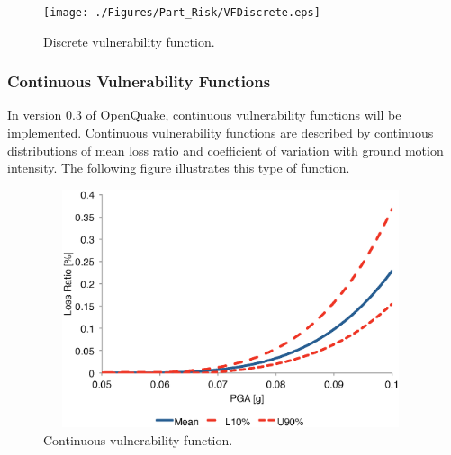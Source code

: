 \begin{figure}[ht]
\centering
\texttt{[image: ./Figures/Part\_Risk/VFDiscrete.eps]}
\caption{Discrete vulnerability function.}
\label{fig:VFDiscrete}
\end{figure}

\subsubsection{Continuous Vulnerability Functions}
In version 0.3 of OpenQuake, continuous vulnerability functions will be implemented. Continuous vulnerability functions are described by continuous distributions of mean loss ratio and coefficient of variation with ground motion intensity. The following figure illustrates this type of function.

\begin{figure}[ht]
\centering
\includegraphics[width=11cm,height=7cm]{./Figures/Part_Risk/VFContinuous}
\caption{Continuous vulnerability function.}
\label{VFContinuous}
\end{figure}

